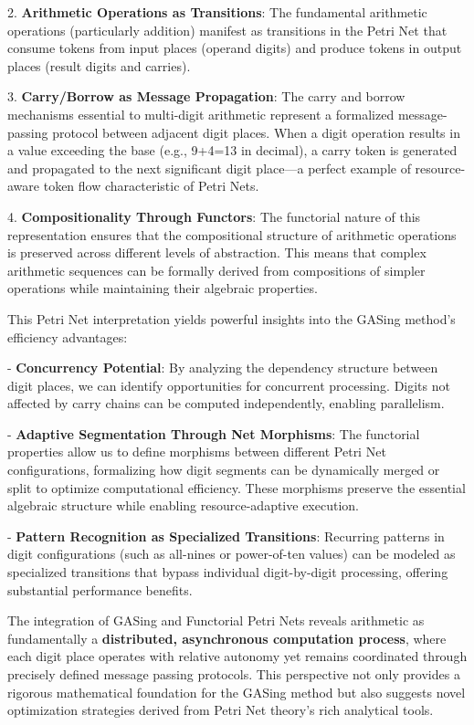 2. \textbf{Arithmetic Operations as Transitions}: The fundamental arithmetic operations (particularly addition) manifest as transitions in the Petri Net that consume tokens from input places (operand digits) and produce tokens in output places (result digits and carries).

3. \textbf{Carry/Borrow as Message Propagation}: The carry and borrow mechanisms essential to multi-digit arithmetic represent a formalized message-passing protocol between adjacent digit places. When a digit operation results in a value exceeding the base (e.g., 9+4=13 in decimal), a carry token is generated and propagated to the next significant digit place—a perfect example of resource-aware token flow characteristic of Petri Nets.

4. \textbf{Compositionality Through Functors}: The functorial nature of this representation ensures that the compositional structure of arithmetic operations is preserved across different levels of abstraction. This means that complex arithmetic sequences can be formally derived from compositions of simpler operations while maintaining their algebraic properties.

This Petri Net interpretation yields powerful insights into the GASing method's efficiency advantages:

- \textbf{Concurrency Potential}: By analyzing the dependency structure between digit places, we can identify opportunities for concurrent processing. Digits not affected by carry chains can be computed independently, enabling parallelism.

- \textbf{Adaptive Segmentation Through Net Morphisms}: The functorial properties allow us to define morphisms between different Petri Net configurations, formalizing how digit segments can be dynamically merged or split to optimize computational efficiency. These morphisms preserve the essential algebraic structure while enabling resource-adaptive execution.

- \textbf{Pattern Recognition as Specialized Transitions}: Recurring patterns in digit configurations (such as all-nines or power-of-ten values) can be modeled as specialized transitions that bypass individual digit-by-digit processing, offering substantial performance benefits.

The integration of GASing and Functorial Petri Nets reveals arithmetic as fundamentally a \textbf{distributed, asynchronous computation process}, where each digit place operates with relative autonomy yet remains coordinated through precisely defined message passing protocols. This perspective not only provides a rigorous mathematical foundation for the GASing method but also suggests novel optimization strategies derived from Petri Net theory's rich analytical tools.

